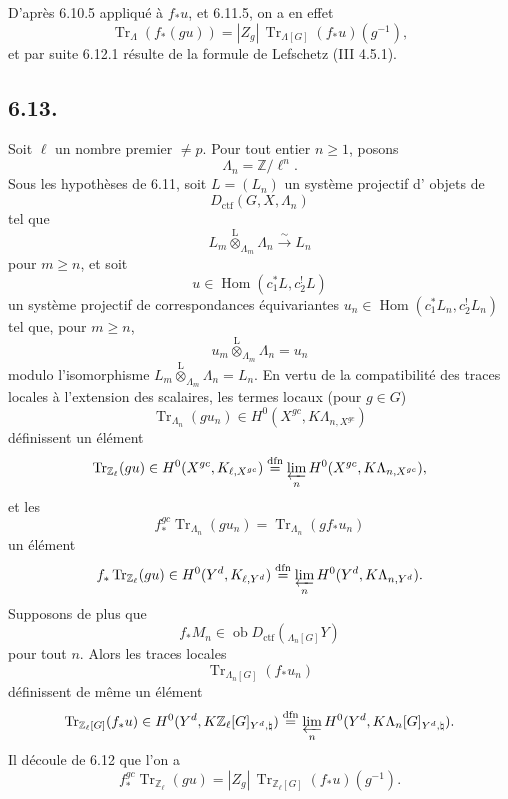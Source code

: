\documentclass[11pt]{article}
\DeclareMathOperator{\Hom}{Hom}
\providecommand{\Tr}{\operatorname{Tr}}
\providecommand{\Tr}{\operatorname{Tr}}
\providecommand{\lten}{\overset{\mathrm L}{\otimes}}
\providecommand{\Ob}{\operatorname{ob}}
\providecommand{\Tr}{\operatorname{Tr}}
\providecommand{\Hom}{\operatorname{Hom}}
\providecommand{\lten}{\overset{\mathrm L}{\otimes}}
\providecommand{\lten}{\overset{\mathrm L}{\otimes}}
\providecommand{\Ob}{\operatorname{ob}}
\providecommand{\Tr}{\operatorname{Tr}}
\providecommand{\lten}{\overset{\mathrm L}{\otimes}}
\providecommand{\lten}{\overset{\mathrm L}{\otimes}}
\providecommand{\Ob}{\operatorname{Ob}}
\providecommand{\lten}{\overset{\mathrm L}{\otimes}}
\providecommand{\Hom}{\operatorname{Hom}}
\providecommand{\Tr}{\operatorname{Tr}}
\providecommand{\Ob}{\operatorname{ob}}
\providecommand{\Ob}{\operatorname{Ob}}
\providecommand{\lten}{\overset{\mathrm L}{\otimes}}
\begin{document}
D'après 6.10.5 appliqué à $f_*u$, et 6.11.5, on a en effet
\[
\Tr_{\Lambda}(f_*(gu))=|Z_g|\,\Tr_{\Lambda[G]}(f_*u)(g^{-1}),
\]
et par suite 6.12.1 résulte de la formule de Lefschetz (III 4.5.1).

\subsection*{6.13.}
Soit $\ell$ un nombre premier $\ne p$. Pour tout entier $n\ge1$, posons
\[
\Lambda_n=\mathbb Z/\ell^n.
\]
Sous les hypothèses de 6.11, soit $L=(L_n)$ un système projectif 
d'%
objets de
\[
D_{\mathrm{ctf}}(G,X,\Lambda_n)
\]
tel que
\[
L_m\lten_{\Lambda_m}\Lambda_n\xrightarrow{\sim}L_n
\]
pour $m\ge n$, et soit
\[
u\in\Hom(c_1^*L,c_2^!L)
\]
un système projectif de correspondances équivariantes $u_n\in\Hom(c_1^*L_n,c_2^!L_n)$ tel que, pour $m\ge n$,
\[
u_m\lten_{\Lambda_m}\Lambda_n=u_n
\]
modulo l'isomorphisme $L_m\lten_{\Lambda_m}\Lambda_n=L_n$. En vertu de la compatibilité des traces locales à l'extension des scalaires, les termes locaux (pour $g\in G$)
\[
\Tr_{\Lambda_n}(gu_n)\in H^0(X^{gc},K\Lambda_{n,X^{gc}})
\]
définissent un élément
\[
\Tr_{\mathbb Z_{\ell}}(gu)\in
H^0(X^{gc},K_{\ell,X^{gc}})
\stackrel{\mathrm{dfn}}{=}
\varprojlim_n H^0(X^{gc},K\Lambda_{n,X^{gc}}),
\]
et les
\[
f_*^{gc}\Tr_{\Lambda_n}(gu_n)=\Tr_{\Lambda_n}(gf_*u_n)
\]
un élément
\[
f_*\Tr_{\mathbb Z_{\ell}}(gu)\in
H^0(Y^d,K_{\ell,Y^d})
\stackrel{\mathrm{dfn}}{=}
\varprojlim_n H^0(Y^d,K\Lambda_{n,Y^d}).
\]
Supposons de plus que
\[
f_*M_n\in\Ob D_{\mathrm{ctf}}({}_{\Lambda_n[G]}Y)
\]
pour tout $n$. Alors les traces locales
\[
\Tr_{\Lambda_n[G]}(f_*u_n)
\]
définissent de même un élément
\[
\Tr_{\mathbb Z_{\ell}[G]}(f_*u)\in
H^0(Y^d,K\mathbb Z_{\ell}[G]_{Y^d,\natural})
\stackrel{\mathrm{dfn}}{=}
\varprojlim_n H^0(Y^d,K\Lambda_n[G]_{Y^d,\natural}).
\]
Il découle de 6.12 que l'on a
\begin{equation}
f_*^{gc}\Tr_{\mathbb Z_{\ell}}(gu)
=
|Z_g|\,\Tr_{\mathbb Z_{\ell}[G]}(f_*u)(g^{-1}).
\tag{6.13.1}
\end{equation}
\end{document}
